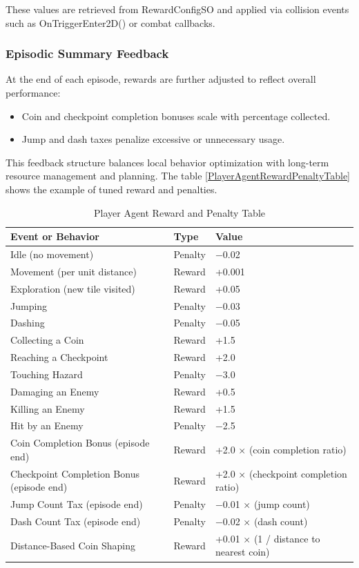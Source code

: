 \documentclass[12pt,oneside,openright,a4paper]{cpe-english-project}
\begin{document}
These values are retrieved from RewardConfigSO and applied via collision events such as OnTriggerEnter2D() or combat callbacks.

\subsubsection{Episodic Summary Feedback}

At the end of each episode, rewards are further adjusted to reflect overall performance:

\begin{itemize}
\item Coin and checkpoint completion bonuses scale with percentage collected.
\item Jump and dash taxes penalize excessive or unnecessary usage.
\end{itemize}

This feedback structure balances local behavior optimization with long-term resource management and planning. The table \ref{PlayerAgentRewardPenaltyTable} shows the example of tuned reward and penalties.

\begin{table}[H]
\caption{Player Agent Reward and Penalty Table}
\label{tbl:PlayerAgentRewardPenaltyTable}
\begin{tabular}{|l|l|l|}
\hline
\textbf{Event or Behavior} & \textbf{Type} & \textbf{Value} \\
\hline
Idle (no movement) & Penalty & −0.02 \\
Movement (per unit distance) & Reward & +0.001 \\
Exploration (new tile visited) & Reward & +0.05 \\
Jumping & Penalty & −0.03 \\
Dashing & Penalty & −0.05 \\
Collecting a Coin & Reward & +1.5 \\
Reaching a Checkpoint & Reward & +2.0 \\
Touching Hazard & Penalty & −3.0 \\
Damaging an Enemy & Reward & +0.5 \\
Killing an Enemy & Reward & +1.5 \\
Hit by an Enemy & Penalty & −2.5 \\
Coin Completion Bonus (episode end) & Reward & +2.0 × (coin completion ratio) \\
Checkpoint Completion Bonus (episode end) & Reward & +2.0 × (checkpoint completion ratio) \\
Jump Count Tax (episode end) & Penalty & −0.01 × (jump count) \\
Dash Count Tax (episode end) & Penalty & −0.02 × (dash count) \\
Distance-Based Coin Shaping & Reward & +0.01 × (1 / distance to nearest coin) \\
\hline
\end{tabular}
\end{table}
\end{document}

